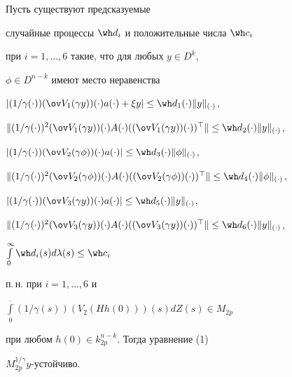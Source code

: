 \begin{cor}


Пусть существуют предсказуемые 


случайные процессы $\wh d_i$ и положительные числа $\wh c_i$ 


при $i = 1,\dotsc, 6$ такие, что для любых $y \in D^k$, 


$\phi \in D^{n-k}$ имеют место неравенства


$|(1/\gamma (\cdot))(\ov V_1(\gamma y))(\cdot)a(\cdot) + \xi y| \le 


\wh d_1(\cdot)\|y\|_{(\cdot)}$,


$\|(1/\gamma (\cdot))^2(\ov V_1(\gamma y))(\cdot)A(\cdot)


((\ov V_1(\gamma y))(\cdot))^\top\| \le \wh d_2(\cdot)\|y\|_{(\cdot)}$,


$|(1/\gamma (\cdot))(\ov V_2(\gamma \phi ))(\cdot)a(\cdot)| \le 


\wh d_3(\cdot)\|\phi\|_{(\cdot)}$,


$\|(1/\gamma (\cdot))^2(\ov V_2(\gamma \phi ))(\cdot)A(\cdot)


((\ov V_2(\gamma \phi ))(\cdot))^\top\|


\le \wh d_4(\cdot)\|\phi \|_{(\cdot)}$,\linebreak


$|(1/\gamma (\cdot))(\ov V_3(\gamma y))(\cdot)a(\cdot)|


\le \wh d_5(\cdot)\|y\|_{(\cdot)}$,


$\|(1/\gamma (\cdot))^2(\ov V_3(\gamma y))(\cdot)A(\cdot)


((\ov V_3(\gamma y))(\cdot))^\top\|


\le \wh d_6(\cdot)\|y\|_{(\cdot)}$, \linebreak


$\int \limits_0^\infty \wh d_i(s)d\lambda (s) \le \wh c_i$ 


п.\,н. при $i = 1,\dotsc, 6$ и 


$\int \limits_0^{\displaystyle .}(1/\gamma(s))(V_2(Hh(0)))(s)dZ(s)\in M_{2p}$ 


при любом $h(0) \in k_{2p}^{n-k}$. Тогда уравнение (1) 


$M_{2p}^{1/\gamma }y$-устойчиво.


\end{cor}





